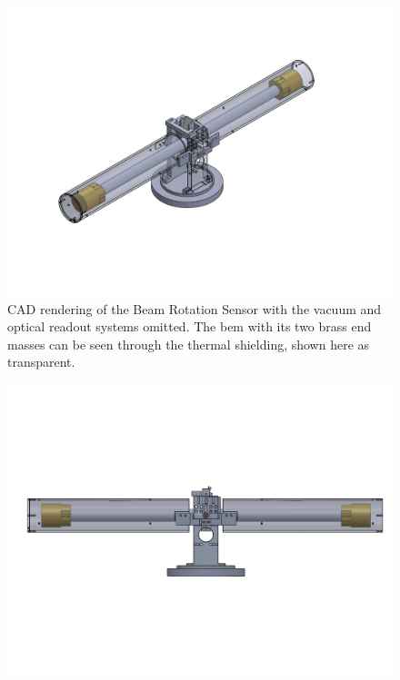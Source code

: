 \documentclass [12pt, proquest]{uwthesis}[2019]
\begin{document}
\begin{figure}
\begin{center} \includegraphics[width=\textwidth]{BRSIso.png}
\caption{CAD rendering of the Beam Rotation Sensor with the vacuum and optical readout systems omitted. The bem with its two brass end masses can be seen through the thermal shielding, shown here as transparent. }
\end{center}
\end{figure} 
\begin{figure}
\begin{center} 
\includegraphics[width=\textwidth]{BRSFront.png}
\label{BRS}

\end{center}
\end{figure}
\end{document}
